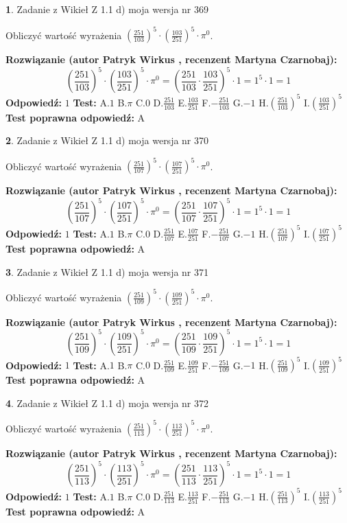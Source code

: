 \documentclass[12pt, a4paper]{article}
\theoremstyle{definition} %
\newtheorem{zad}{}
\newcommand{\zadStart}[1]{\begin{zad}#1\newline}
\newcommand{\zadStop}{\end{zad}}
\newcommand{\rozwStart}[2]{\noindent \textbf{Rozwiązanie (autor #1 , recenzent #2): }\newline}
\newcommand{\rozwStop}{\newline}
\newcommand{\odpStart}{\noindent \textbf{Odpowiedź:}\newline}
\newcommand{\odpStop}{\newline}
\newcommand{\testStart}{\noindent \textbf{Test:}\newline}
\newcommand{\testStop}{\newline}
\newcommand{\kluczStart}{\noindent \textbf{Test poprawna odpowiedź:}\newline}
\newcommand{\kluczStop}{\newline}
\begin{document}
\zadStart{Zadanie z Wikieł Z 1.1 d) moja wersja nr 369}

Obliczyć wartość wyrażenia $(\frac{251}{103})^{5} \cdot (\frac{103}{251})^{5} \cdot \pi^{0}$.
\zadStop
\rozwStart{Patryk Wirkus}{Martyna Czarnobaj}
$$(\frac{251}{103})^{5} \cdot (\frac{103}{251})^{5} \cdot \pi^{0} = (\frac{251}{103} \cdot \frac{103}{251})^{5} \cdot 1 = 1^{5} \cdot 1 = 1$$
\rozwStop
\odpStart
$1$
\odpStop
\testStart
A.$1$ B.$\pi$ C.$0$ D.$\frac{251}{103}$ E.$\frac{103}{251}$
F.$-\frac{251}{103}$ G.$-1$
H.$(\frac{251}{103})^{5}$
I.$(\frac{103}{251})^{5}$
\testStop
\kluczStart
A
\kluczStop



\zadStart{Zadanie z Wikieł Z 1.1 d) moja wersja nr 370}

Obliczyć wartość wyrażenia $(\frac{251}{107})^{5} \cdot (\frac{107}{251})^{5} \cdot \pi^{0}$.
\zadStop
\rozwStart{Patryk Wirkus}{Martyna Czarnobaj}
$$(\frac{251}{107})^{5} \cdot (\frac{107}{251})^{5} \cdot \pi^{0} = (\frac{251}{107} \cdot \frac{107}{251})^{5} \cdot 1 = 1^{5} \cdot 1 = 1$$
\rozwStop
\odpStart
$1$
\odpStop
\testStart
A.$1$ B.$\pi$ C.$0$ D.$\frac{251}{107}$ E.$\frac{107}{251}$
F.$-\frac{251}{107}$ G.$-1$
H.$(\frac{251}{107})^{5}$
I.$(\frac{107}{251})^{5}$
\testStop
\kluczStart
A
\kluczStop



\zadStart{Zadanie z Wikieł Z 1.1 d) moja wersja nr 371}

Obliczyć wartość wyrażenia $(\frac{251}{109})^{5} \cdot (\frac{109}{251})^{5} \cdot \pi^{0}$.
\zadStop
\rozwStart{Patryk Wirkus}{Martyna Czarnobaj}
$$(\frac{251}{109})^{5} \cdot (\frac{109}{251})^{5} \cdot \pi^{0} = (\frac{251}{109} \cdot \frac{109}{251})^{5} \cdot 1 = 1^{5} \cdot 1 = 1$$
\rozwStop
\odpStart
$1$
\odpStop
\testStart
A.$1$ B.$\pi$ C.$0$ D.$\frac{251}{109}$ E.$\frac{109}{251}$
F.$-\frac{251}{109}$ G.$-1$
H.$(\frac{251}{109})^{5}$
I.$(\frac{109}{251})^{5}$
\testStop
\kluczStart
A
\kluczStop



\zadStart{Zadanie z Wikieł Z 1.1 d) moja wersja nr 372}

Obliczyć wartość wyrażenia $(\frac{251}{113})^{5} \cdot (\frac{113}{251})^{5} \cdot \pi^{0}$.
\zadStop
\rozwStart{Patryk Wirkus}{Martyna Czarnobaj}
$$(\frac{251}{113})^{5} \cdot (\frac{113}{251})^{5} \cdot \pi^{0} = (\frac{251}{113} \cdot \frac{113}{251})^{5} \cdot 1 = 1^{5} \cdot 1 = 1$$
\rozwStop
\odpStart
$1$
\odpStop
\testStart
A.$1$ B.$\pi$ C.$0$ D.$\frac{251}{113}$ E.$\frac{113}{251}$
F.$-\frac{251}{113}$ G.$-1$
H.$(\frac{251}{113})^{5}$
I.$(\frac{113}{251})^{5}$
\testStop
\kluczStart
A
\kluczStop
\end{document}
